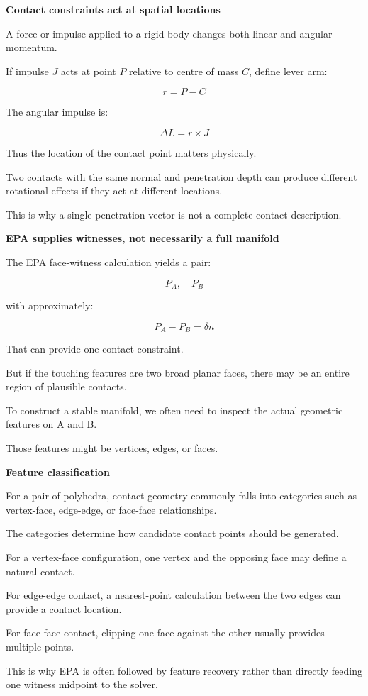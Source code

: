 \textbf{Contact constraints act at spatial locations}

A force or impulse applied to a rigid body changes both linear and angular momentum.

If impulse \(J\) acts at point \(P\) relative to centre of mass \(C\), define lever arm:

\[
r=P-C
\]

The angular impulse is:

\[
\boxed{ \Delta L=r\times J }
\]

Thus the location of the contact point matters physically.

Two contacts with the same normal and penetration depth can produce different rotational effects if they act at different locations.

This is why a single penetration vector is not a complete contact description.

\textbf{EPA supplies witnesses, not necessarily a full manifold}

The EPA face-witness calculation yields a pair:

\[
P_A,\quad P_B
\]

with approximately:

\[
P_A-P_B=\delta n
\]

That can provide one contact constraint.

But if the touching features are two broad planar faces, there may be an entire region of plausible contacts.

To construct a stable manifold, we often need to inspect the actual geometric features on A and B.

Those features might be vertices, edges, or faces.

\textbf{Feature classification}

For a pair of polyhedra, contact geometry commonly falls into categories such as vertex-face, edge-edge, or face-face relationships.

The categories determine how candidate contact points should be generated.

For a vertex-face configuration, one vertex and the opposing face may define a natural contact.

For edge-edge contact, a nearest-point calculation between the two edges can provide a contact location.

For face-face contact, clipping one face against the other usually provides multiple points.

This is why EPA is often followed by feature recovery rather than directly feeding one witness midpoint to the solver.

